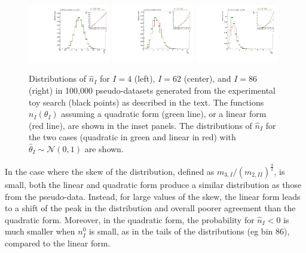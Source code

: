 \documentclass[11pt]{article}
\begin{document}
\begin{figure}%
  \centering
  \includegraphics[width=0.32\textwidth]{figures/distribution_4}
  \includegraphics[width=0.32\textwidth]{figures/distribution_62}
  \includegraphics[width=0.32\textwidth]{figures/distribution_86}
  \caption{Distributions of $\hat{n}_{I}$ for $I=4$ (left), $I=62$ (center), and $I=86$ (right) in 100,000 pseudo-datasets generated from the experimental toy search (black points) as described in the text.
    The functions $n_{I}(\theta_{I})$ assuming a quadratic form (green line), or
    a linear form (red line), are shown in the inset panels.  The distributions
    of $\hat{n}_{I}$ for the two cases (quadratic in green and linear in red)
    with $\hat{\theta}_{I}\sim\mathcal{N}(0,1)$ are shown.  }
  \label{fig:distributions}
\end{figure}

In the case where the skew of the distribution, defined as $m_{3,I}/(m_{2,II})^{\frac{3}{2}}$, is small,
both the linear and quadratic form produce a similar distribution as those from the pseudo-data.
Instead, for large values of the skew, the linear form leads to a shift of the peak in the distribution and overall poorer
agreement than the quadratic form. Moreover, in the quadratic form, the probability for $\hat{n}_{I}<0$
is much smaller when $n^{0}_{I}$ is small, as in the tails of the distributions (eg bin $86$), compared to the linear form.
\end{document}
